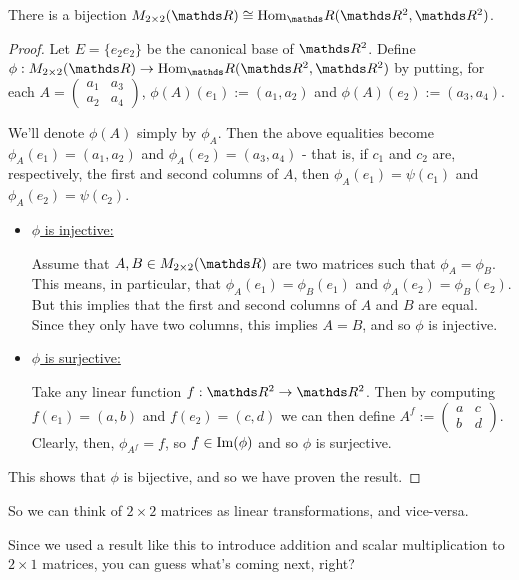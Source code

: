 \begin{prop}
	There is a bijection $M_{2\times 2}(\R)\iso\hom_\R(\R^2,\R^2)$.
\end{prop}
\begin{proof}
	Let $E=\{e_2e_2\}$ be the canonical base of $\R^2$. Define $\phi:M_{2\times 2}(\R)\to \hom_\R(\R^2,\R^2)$ by putting, for each $A=\begin{pmatrix}
	a_1&a_3\\a_2&a_4
	\end{pmatrix}$, $\phi(A)(e_1):=(a_1,a_2)$ and $\phi(A)(e_2):=(a_3,a_4)$.
	
	We'll denote $\phi(A)$ simply by $\phi_A$. Then the above equalities become $\phi_A(e_1)=(a_1,a_2)$ and $\phi_A(e_2)=(a_3,a_4)$ -  that is, if $c_1$ and $c_2$ are, respectively, the first and second columns of $A$, then $\phi_A(e_1)=\psi(c_1)$ and $\phi_A(e_2)=\psi(c_2)$.
	
	\begin{itemize}
		\item \underline{$\phi$ is injective:}
		
		Assume that $A,B\in M_{2\times 2}(\R)$ are two matrices such that $\phi_A=\phi_B$. This means, in particular, that $\phi_A(e_1)=\phi_B(e_1)$ and $\phi_A(e_2)=\phi_B(e_2)$. But this implies that the first and second columns of $A$ and $B$ are equal. Since they only have two columns, this implies $A=B$, and so $\phi$ is injective.
		
		\item \underline{$\phi$ is surjective:}
		
		Take any linear function $f:\R^2\to \R^2$. Then by computing $f(e_1)=(a,b)$ and $f(e_2)=(c,d)$ we can then define $A^f:=\begin{pmatrix}
		a&c\\b&d
		\end{pmatrix}$. Clearly, then, $\phi_{A^f}=f$, so $f\in\operatorname{Im}(\phi)$ and so $\phi$ is surjective.
	\end{itemize}

This shows that $\phi$ is bijective, and so we have proven the result.
\end{proof}

So we can think of $2\times 2$ matrices as linear transformations, and vice-versa.

Since we used a result like this to introduce addition and scalar multiplication to $2\times 1$ matrices, you can guess what's coming next, right?

